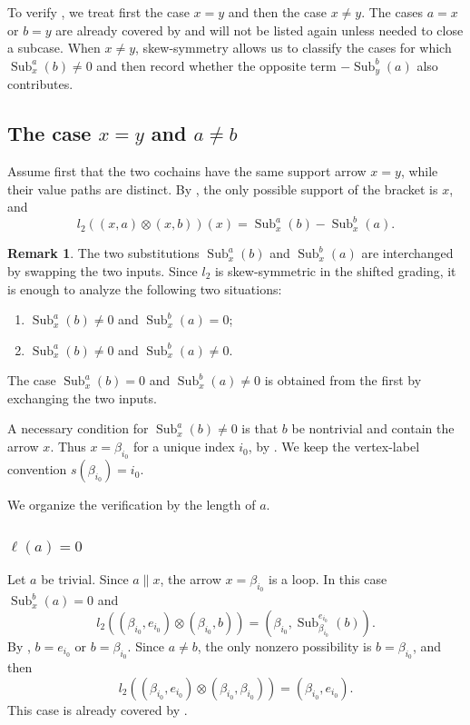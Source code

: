 \documentclass[11pt,a4paper,reqno]{amsart}
\newcommand{\Sub}{\operatorname{Sub}}
\newcommand{\para}[2]{(#1,#2)}
\newcommand{\bi}{\beta_{i_0}}
\newcommand{\ei}{e_{i_0}}
\theoremstyle{plain}
\theoremstyle{definition}
\newtheorem{remark}[remark]{Remark}
\numberwithin{equation}{section}
\begin{document}
	To verify , we treat first the case
	$x=y$ and then the case $x\neq y$.  The cases $a=x$ or $b=y$ are already
	covered by  and will not be listed again unless needed
	to close a subcase.  When $x\neq y$, skew-symmetry allows us to classify the
	cases for which $\Sub_x^a(b)\neq0$ and then record whether the opposite term
	$-\Sub_y^b(a)$ also contributes.
	
	\subsection{The case \texorpdfstring{$x=y$}{x=y} and \texorpdfstring{$a\neq b$}{a not equal b}}\label{subsec:degree-zero-xeqy}
	Assume first that the two cochains have the same support arrow $x=y$, while
	their value paths are distinct.  By , the only possible support of
	the bracket is $x$, and
	\[l_2(\para{x}{a}\otimes \para{x}{b})(x)=\Sub_x^a(b)-\Sub_x^b(a).\]
	
	\begin{remark}
		The two substitutions $\Sub_x^a(b)$ and $\Sub_x^b(a)$ are interchanged by
		swapping the two inputs.  Since $l_2$ is skew-symmetric in the shifted
		grading, it is enough to analyze the following two situations:
		\begin{enumerate}
			\item $\Sub_x^a(b)\neq0$ and $\Sub_x^b(a)=0$;
			\item $\Sub_x^a(b)\neq0$ and $\Sub_x^b(a)\neq0$.
		\end{enumerate}
		The case $\Sub_x^a(b)=0$ and $\Sub_x^b(a)\neq0$ is obtained from the first by
		exchanging the two inputs.
	\end{remark}
	
	A necessary condition for $\Sub_x^a(b)\neq0$ is that
	$b$ be nontrivial and contain the arrow $x$.  Thus $x=\bi$ for a unique index
	$i_0$, by .  We keep the vertex-label convention
	$s(\bi)=i_0$.
	
	We organize the verification by the length of $a$.
	
	\subsubsection{$\ell(a)=0$}
	Let $a$ be trivial.  Since $a\parallel x$, the arrow $x=\bi$ is a loop.  In
	this case $\Sub_x^b(a)=0$ and
	\[
	l_2(\para{\bi}{\ei}\otimes\para{\bi}{b})
	=
	\para{\bi}{\Sub_{\bi}^{\ei}(b)}.
	\]
	By , $b=\ei$ or $b=\bi$.  Since $a\neq b$, the only nonzero
	possibility is $b=\bi$, and then
	\[
	l_2(\para{\bi}{\ei}\otimes\para{\bi}{\bi})
	=
	\para{\bi}{\ei}.
	\]
	This case is already covered by .
	
\end{document}
